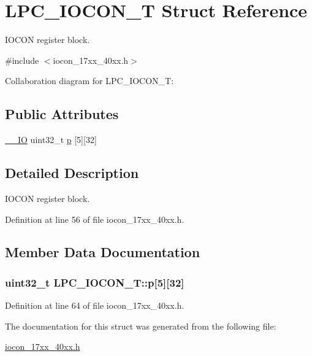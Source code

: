\hypertarget{structLPC__IOCON__T}{}\section{L\+P\+C\+\_\+\+I\+O\+C\+O\+N\+\_\+T Struct Reference}
\label{structLPC__IOCON__T}


I\+O\+C\+ON register block.  




{\ttfamily \#include $<$iocon\+\_\+17xx\+\_\+40xx.\+h$>$}



Collaboration diagram for L\+P\+C\+\_\+\+I\+O\+C\+O\+N\+\_\+T\+:
\subsection*{Public Attributes}
\begin{DoxyCompactItemize}
\item 
\hyperlink{core__cm3_8h_aec43007d9998a0a0e01faede4133d6be}{\+\_\+\+\_\+\+IO} uint32\+\_\+t \hyperlink{structLPC__IOCON__T_aea0d3512ec47df7ef7573774e36349c8}{p} \mbox{[}5\mbox{]}\mbox{[}32\mbox{]}
\end{DoxyCompactItemize}


\subsection{Detailed Description}
I\+O\+C\+ON register block. 

Definition at line 56 of file iocon\+\_\+17xx\+\_\+40xx.\+h.



\subsection{Member Data Documentation}
\subsubsection[{\texorpdfstring{p}{p}}]{ uint32\+\_\+t L\+P\+C\+\_\+\+I\+O\+C\+O\+N\+\_\+\+T\+::p\mbox{[}5\mbox{]}\mbox{[}32\mbox{]}}\hypertarget{structLPC__IOCON__T_aea0d3512ec47df7ef7573774e36349c8}{}\label{structLPC__IOCON__T_aea0d3512ec47df7ef7573774e36349c8}


Definition at line 64 of file iocon\+\_\+17xx\+\_\+40xx.\+h.



The documentation for this struct was generated from the following file\+:\begin{DoxyCompactItemize}
\item 
\hyperlink{iocon__17xx__40xx_8h}{iocon\+\_\+17xx\+\_\+40xx.\+h}\end{DoxyCompactItemize}
